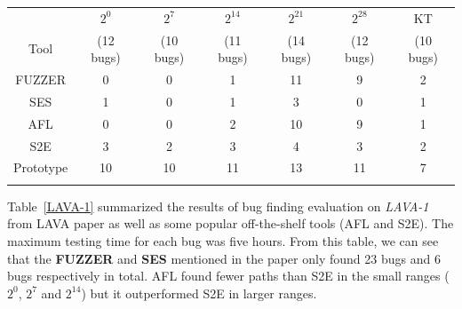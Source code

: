 \begin{table}[!b]
{\begin{tabular*}{20pc}{@{\extracolsep{\fill}}ccccccc@{\extracolsep{\fill}}}\toprule
& $2^0$ & $2^7$  & $2^{14}$ & $2^{21}$ & $2^{28}$ & KT \\
	      Tool   & (12 bugs) & (10 bugs) & (11 bugs) & (14 bugs) & (12 bugs) & (10 bugs)\\
\midrule
		FUZZER 		& 0   & 0   & 1    & 11    & 9     & 2  \\
		SES	        & 1   & 0   & 1    & 3     & 0     & 1  \\
		AFL		    & 0   & 0   & 2    & 10    & 9     & 1   \\
		S2E			& 3   & 2   & 3    & 4     & 3     & 2   \\
		Prototype	& 10  & 10  & 11   & 13    & 11    & 7   \\
\botrule
\end{tabular*}}{}
\end{table}

Table~\ref{LAVA-1} summarized the results of bug finding evaluation on \textit{LAVA-1} from LAVA paper as well as some popular off-the-shelf tools (AFL and S2E). The maximum testing time for each bug was five hours. From this table, we can see that the \textbf{FUZZER} and \textbf{SES} mentioned in the paper only found 23 bugs and 6 bugs respectively in total. AFL found fewer paths than S2E in the small ranges ($2^0$, $2^7$ and $2^{14}$) but it outperformed S2E in larger ranges. 

